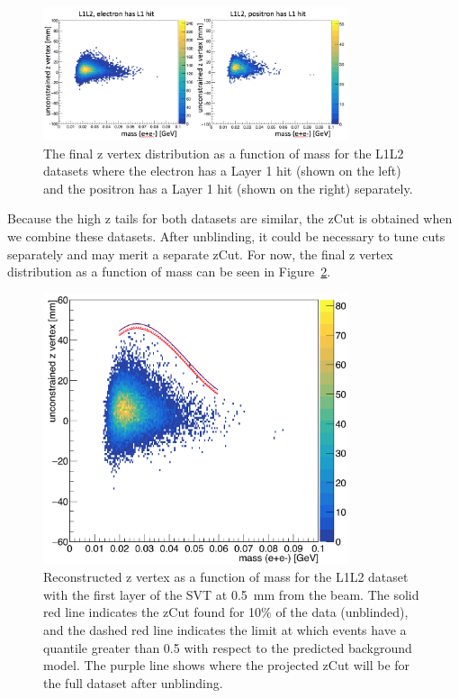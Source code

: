 \documentclass[twoside]{article}
\begin{document}
\begin{figure}[H]
  \centering
     \includegraphics[width=0.8\textwidth]{plots/L1L2_datasets.png}
  \caption{The final z vertex distribution as a function of mass for the L1L2 datasets where the electron has a Layer 1 hit (shown on the left) and the positron has a Layer 1 hit (shown on the right) separately.}
  \label{fig:L1L2_datasets}
\end{figure} 

Because the high z tails for both datasets are similar, the zCut is obtained when we combine these datasets. After unblinding, it could be necessary to tune cuts separately and may merit a separate zCut. For now, the final z vertex distribution as a function of mass can be seen in Figure~\ref{fig:zVm_L1L2}.

\begin{figure}[H]
  \centering
     \includegraphics[width=0.8\textwidth]{plots/zVm_L1L2_0p5.png}
  \caption{Reconstructed z vertex as a function of mass for the L1L2 dataset with the first layer of the SVT at 0.5~mm from the beam. The solid red line indicates the zCut found for 10$\%$ of the data (unblinded), and the dashed red line indicates the limit at which events have a quantile greater than 0.5 with respect to the predicted background model. The purple line shows where the projected zCut will be for the full dataset after unblinding.}
  \label{fig:zVm_L1L2}
\end{figure} 
\end{document}
